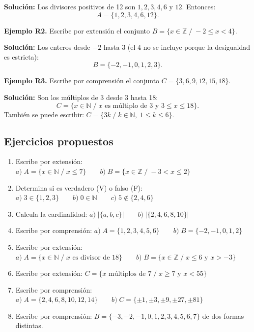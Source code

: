\documentclass[12pt, letterpaper]{article}
\newcommand{\N}{\mathbb{N}}
\newcommand{\Z}{\mathbb{Z}}
\begin{document}
\begin{cuadrosolucion}
  \textbf{Solución:} Los divisores positivos de 12 son $1, 2, 3, 4, 6$ y $12$. Entonces:
  $$A = \{1, 2, 3, 4, 6, 12\}.$$
\end{cuadrosolucion}

\textbf{Ejemplo R2.} Escribe por extensión el conjunto $B = \{x \in \Z \;/\; -2 \leq x < 4\}$.

\begin{cuadrosolucion}
  \textbf{Solución:} Los enteros desde $-2$ hasta $3$ (el 4 no se incluye porque la desigualdad es estricta):
  $$B = \{-2, -1, 0, 1, 2, 3\}.$$
\end{cuadrosolucion}

\textbf{Ejemplo R3.} Escribe por comprensión el conjunto $C = \{3, 6, 9, 12, 15, 18\}$.

\begin{cuadrosolucion}
  \textbf{Solución:} Son los múltiplos de 3 desde 3 hasta 18:
  $$C = \{x \in \N \;/\; x \text{ es múltiplo de } 3 \text{ y } 3 \leq x \leq 18\}.$$
  También se puede escribir: $C = \{3k \;/\; k \in \N, \; 1 \leq k \leq 6\}$.
\end{cuadrosolucion}

\subsection{Ejercicios propuestos}

\begin{enumerate}[leftmargin=*]
  \item \facil{} Escribe por extensión: $a) \; A = \{x \in \N \;/\; x \leq 7\} \qquad b) \; B = \{x \in \Z \;/\; -3 < x \leq 2\}$

  \item \facil{} Determina si es verdadero (V) o falso (F): $a) \; 3 \in \{1, 2, 3\} \qquad b) \; 0 \in \N \qquad c) \; 5 \notin \{2, 4, 6\}$

  \item \facil{} Calcula la cardinalidad: $a) \; |\{a, b, c\}| \qquad b) \; |\{2, 4, 6, 8, 10\}|$

  \item \facil{} Escribe por comprensión: $a) \; A = \{1, 2, 3, 4, 5, 6\} \qquad b) \; B = \{-2, -1, 0, 1, 2\}$

  \item \medio{} Escribe por extensión: $a) \; A = \{x \in \N \;/\; x \text{ es divisor de } 18\} \qquad b) \; B = \{x \in \Z \;/\; x \leq 6 \text{ y } x > -3\}$

  \item \medio{} Escribe por extensión: $C = \{x \text{ múltiplos de } 7 \;/\; x \geq 7 \text{ y } x < 55\}$

  \item \medio{} Escribe por comprensión: $a) \; A = \{2, 4, 6, 8, 10, 12, 14\} \qquad b) \; C = \{\pm 1, \pm 3, \pm 9, \pm 27, \pm 81\}$

  \item \dificil{} Escribe por comprensión: $B = \{-3, -2, -1, 0, 1, 2, 3, 4, 5, 6, 7\}$ de dos formas distintas.
\end{enumerate}
\end{document}
